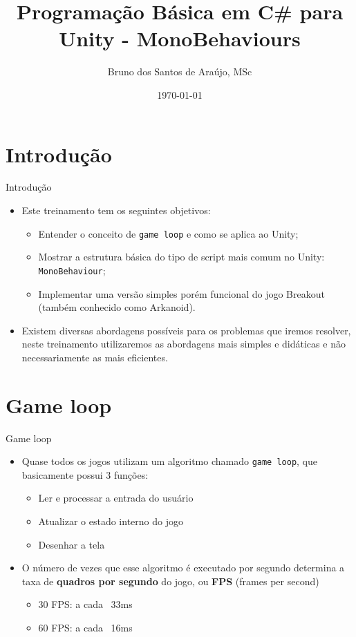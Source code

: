 \documentclass{beamer}
\begin{document}
\title{Programação Básica em C\# para Unity - MonoBehaviours}   
\author{Bruno dos Santos de Araújo, MSc} 
\date{\today} 


\frame{\titlepage} 


\section{Introdução}

\begin{frame}[fragile]{Introdução}
	\begin{itemize}
		\item Este treinamento tem os seguintes objetivos:
		\begin{itemize}
			\item Entender o conceito de \verb|game loop| e como se aplica ao Unity;
			\item Mostrar a estrutura básica do tipo de script mais comum no Unity: \verb|MonoBehaviour|;
			\item Implementar uma versão simples porém funcional do jogo Breakout (também conhecido como Arkanoid).
		\end{itemize}
		\item Existem diversas abordagens possíveis para os problemas que iremos resolver, neste treinamento utilizaremos as abordagens mais simples e didáticas e não necessariamente as mais eficientes.
	\end{itemize}
\end{frame}

\section{Game loop}

\begin{frame}[fragile]{Game loop}
	\begin{itemize}
		\item Quase todos os jogos utilizam um algoritmo chamado \verb|game loop|, que basicamente possui 3 funções:
		\begin{itemize}
			\item Ler e processar a entrada do usuário
			\item Atualizar o estado interno do jogo
			\item Desenhar a tela
		\end{itemize}
		\item O número de vezes que esse algoritmo é executado por segundo determina a taxa de \textbf{quadros por segundo} do jogo, ou \textbf{FPS} (frames per second)
		\begin{itemize}
			\item 30 FPS: a cada ~33ms
			\item 60 FPS: a cada ~16ms
		\end{itemize}
	\end{itemize}
\end{frame}
\end{document}
